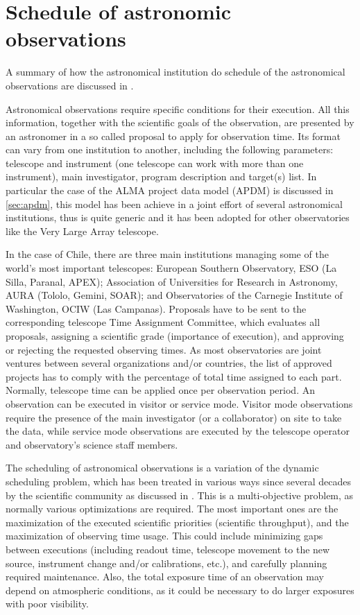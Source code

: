 \section{Schedule of astronomic observations}

A summary of how the astronomical institution do schedule of the astronomical observations are discussed in \cite{mora11}.

Astronomical observations require specific conditions for their execution. All this information, together with the scientific goals of the observation, are presented by an astronomer in a so called proposal to apply for observation time. Its format can vary from one institution to another, including the following parameters: telescope and instrument (one telescope can work with more than one instrument), main investigator, program description and target(s) list. In particular the case of the ALMA project data model (APDM) is discussed in \ref{sec:apdm}, this model has been achieve in a joint effort of several astronomical institutions, thus is quite generic and it has been adopted for other observatories like the Very Large Array telescope.

In the case of Chile, there are three main institutions managing some of the world’s most important telescopes: European Southern Observatory, ESO (La Silla, Paranal, APEX); Association of Universities for Research in Astronomy, AURA (Tololo, Gemini, SOAR); and Observatories of the Carnegie Institute of Washington, OCIW (Las Campanas). Proposals have to be sent to the corresponding telescope Time Assignment Committee, which evaluates all proposals, assigning a scientific grade (importance of execution), and approving or rejecting the requested observing times. As most observatories are joint ventures between several organizations and/or countries, the list of approved projects has to comply with the percentage of total time assigned to each part. Normally, telescope time can be applied once per observation period. An observation can be executed in visitor or service mode. Visitor mode observations require the presence of the main investigator (or a collaborator) on site to take the data, while service mode observations are executed by the telescope operator and observatory’s science staff members.

The scheduling of astronomical observations is a variation of the dynamic scheduling problem, which has been treated in various ways since several decades by the scientific community as discussed in \cite{gomez03}. This is a multi-objective problem, as normally various optimizations are required. The most important ones are the maximization of the executed scientific priorities (scientific throughput), and the maximization of observing time usage. This could include minimizing gaps between executions (including readout time, telescope movement to the new source, instrument change and/or calibrations, etc.), and carefully planning required maintenance. Also, the total exposure time of an observation may depend on atmospheric conditions, as it could be necessary to do larger exposures with poor visibility.

